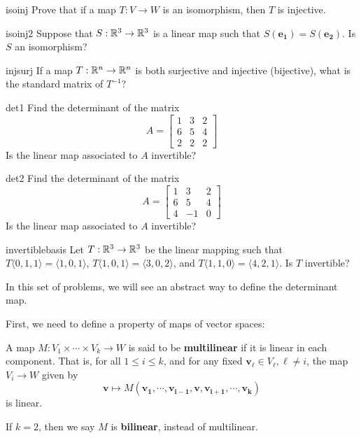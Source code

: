 \begin{problem}{isoinj}
    Prove that if a map $T : V \to W$ is an isomorphism, then $T$ is injective.
\end{problem}

\begin{problem}{isoinj2}
    Suppose that $S: \mathbb{R}^3 \to \mathbb{R}^3$ is a linear map such that $S(\bm{e_1}) = S(\bm{e_2})$.  Is $S$ an isomorphism?
\end{problem}

\begin{problem}{injsurj}
    If a map $T : \mathbb{R}^n \to \mathbb{R}^n$ is both surjective and injective (bijective), what is the standard matrix of $T^{-1}$?
\end{problem}

\begin{problem}{det1}
     Find the determinant of the matrix \begin{equation*}
A = 
\begin{bmatrix}
1 & 3 & 2 \\
6 & 5 & 4 \\
2 & 2 & 2
\end{bmatrix}
\end{equation*}
Is the linear map associated to $A$ invertible?
\end{problem}

\begin{problem}{det2}
     Find the determinant of the matrix \begin{equation*}
A = 
\begin{bmatrix}
1 & 3 & 2 \\
6 & 5 & 4 \\
4 & -1 & 0
\end{bmatrix}
\end{equation*}
Is the linear map associated to $A$ invertible?
\end{problem}

\begin{problem}{invertiblebasis}
    Let $T : \mathbb{R}^3 \to \mathbb{R}^3$ be the linear mapping such that $T\langle0,1,1\rangle = \langle1,0,1\rangle$, $T\langle1,0,1\rangle = \langle3,0,2\rangle$, and $T\langle1,1,0\rangle = \langle4,2,1\rangle$.  Is $T$ invertible?
\end{problem}


In this set of problems, we will see an abstract way to define the determinant map.  

First, we need to define a property of maps of vector spaces:

\begin{definition}
    A map $M : V_1 \times \cdots \times V_k \to W$ is said to be \textbf{multilinear} if it is linear in each component.  That is, for all $1 \leq i \leq k$, and for any fixed $\bm{v_\ell} \in V_\ell, \ell \neq i$, the map $V_i \to W$ given by $$\bm{v} \mapsto M(\bm{v_1}, \cdots, \bm{v_{i-1}}, \bm{v}, \bm{v_{i+1}}, \cdots, \bm{v_k})$$ is linear.
    
    If $k=2$, then we say $M$ is \textbf{bilinear}, instead of multilinear.
    \end{definition}

